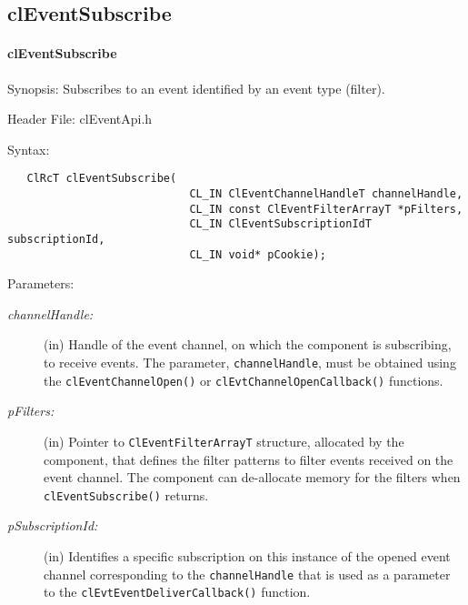 \begin{flushleft}
\subsection{clEventSubscribe}
\hypertarget{pageem114}{}\paragraph{cl\-Event\-Subscribe}\label{pageem114}
\begin{Desc}
\item[Synopsis:]Subscribes to an event identified by an event type (filter).\end{Desc}
\begin{Desc}
\item[Header File:]clEventApi.h\end{Desc}
\begin{Desc}
\item[Syntax:]

\footnotesize\begin{verbatim}   ClRcT clEventSubscribe(
              				CL_IN ClEventChannelHandleT channelHandle,
              				CL_IN const ClEventFilterArrayT *pFilters,
              				CL_IN ClEventSubscriptionIdT subscriptionId,
              				CL_IN void* pCookie);
\end{verbatim}
\normalsize
\end{Desc}
\begin{Desc}
\item[Parameters:]
\begin{description}
\item[{\em channel\-Handle:}](in) Handle of the event channel, on which the component is subscribing, to receive events. The parameter, 
{\tt{channelHandle}}, must be obtained using the {\tt{clEventChannelOpen()}} or {\tt{clEvtChannelOpenCallback()}} functions. 
\item[{\em p\-Filters:}](in) Pointer to {\tt{ClEventFilterArrayT}} structure, allocated by the component, that 
defines the filter patterns to filter events received on the event channel. The component can de-allocate memory for the filters when 
{\tt{clEventSubscribe()}} returns.

\item[{\em p\-Subscription\-Id:}](in) Identifies a specific subscription on this instance of the opened event channel corresponding to the 
{\tt{channelHandle}} that is used as a parameter to the {\tt{clEvtEventDeliverCallback()}} function. 


\end{description}
\end{Desc}
\end{flushleft}
